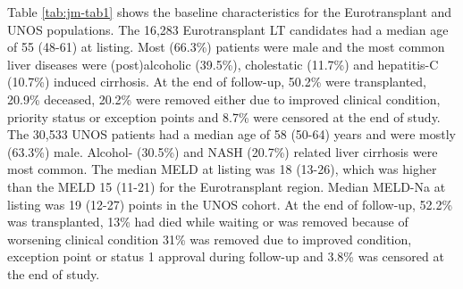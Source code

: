 \documentclass[11pt,english,]{book} %
\begin{document}
Table \ref{tab:jm-tab1} shows the baseline characteristics for the Eurotransplant and UNOS populations. The 16,283 Eurotransplant LT candidates had a median age of 55 (48-61) at listing. Most (66.3\%) patients were male and the most common liver diseases were (post)alcoholic (39.5\%), cholestatic (11.7\%) and hepatitis-C (10.7\%) induced cirrhosis. At the end of follow-up, 50.2\% were transplanted, 20.9\% deceased, 20.2\% were removed either due to improved clinical condition, priority status or exception points and 8.7\% were censored at the end of study. The 30,533 UNOS patients had a median age of 58 (50-64) years and were mostly (63.3\%) male. Alcohol- (30.5\%) and NASH (20.7\%) related liver cirrhosis were most common. The median MELD at listing was 18 (13-26), which was higher than the MELD 15 (11-21) for the Eurotransplant region. Median MELD-Na at listing was 19 (12-27) points in the UNOS cohort. At the end of follow-up, 52.2\% was transplanted, 13\% had died while waiting or was removed because of worsening clinical condition 31\% was removed due to improved condition, exception point or status 1 approval during follow-up and 3.8\% was censored at the end of study.

\linespread{1}
\end{document}
